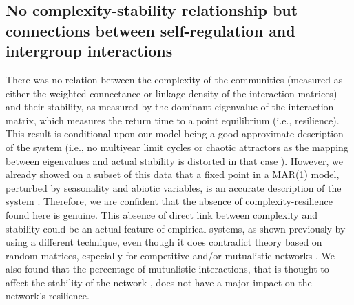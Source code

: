 \documentclass[10pt]{article}
\begin{document}
\subsection*{No complexity-stability relationship but connections between self-regulation
and intergroup interactions}

There was no relation between the complexity of the communities (measured
as either the weighted connectance or linkage density of the interaction
matrices) and their stability, as measured by the dominant eigenvalue
of the interaction matrix, which measures the return time to a point
equilibrium (i.e., resilience). This result is conditional upon our
model being a good approximate description of the system (i.e., no
multiyear limit cycles or chaotic attractors as the mapping between
eigenvalues and actual stability is distorted in that case \citealp{certain_how_2018}).
However, we already showed on a subset of this data that a fixed point
in a MAR(1) model, perturbed by seasonality and abiotic variables,
is an accurate description of the system \citep{barraquand_coastal_2018}.
Therefore, we are confident that the absence of complexity-resilience
found here is genuine. This absence of direct link between complexity
and stability could be an actual feature of empirical systems, as
shown previously by \citet{jacquet_no_2016} using a different technique,
even though it does contradict theory
based on random matrices, especially for competitive and/or mutualistic
networks \citep{allesina_stability_2012}. We also found that the
percentage of mutualistic interactions, that is thought to affect
the stability of the network \citep{mougi2012diversity,coyte_ecology_2015,garcia-callejas_multiple_2018},
does not have a major impact on the network's resilience.
\end{document}
